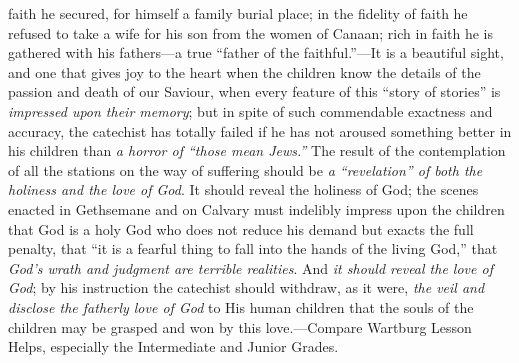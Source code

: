 faith he secured, for himself a family burial place; in the fidelity of faith he refused to take a wife for his son from the women of Canaan; rich in faith he is gathered with his fathers—a true “father of the faithful.”—It is a beautiful sight, and one that gives joy to the heart when the children know the details of the passion
and death of our Saviour, when every feature of this “story of stories” is \emph{impressed upon their memory}; but in spite of such commendable exactness and accuracy, the catechist has totally failed if he has not aroused something better in his children than \emph{a horror of “those mean Jews.”} The result of the contemplation of all the stations on the way of suffering should be \emph{a “revelation” of both the holiness and the love of God}. It should reveal the holiness of God; the scenes enacted in Gethsemane and on Calvary must indelibly impress upon the children that God is a holy God who does not reduce his demand but exacts the full penalty, that “it is a fearful thing to fall into the hands of the living God,” that \emph{God’s wrath and judgment are terrible realities}. And \emph{it should reveal the love of God}; by his instruction the catechist should withdraw, as it were, \emph{the veil and disclose the fatherly love of God} to His human children that the souls of the children may be grasped and won by this love.—Compare Wartburg Lesson Helps, especially the Intermediate and Junior Grades.

